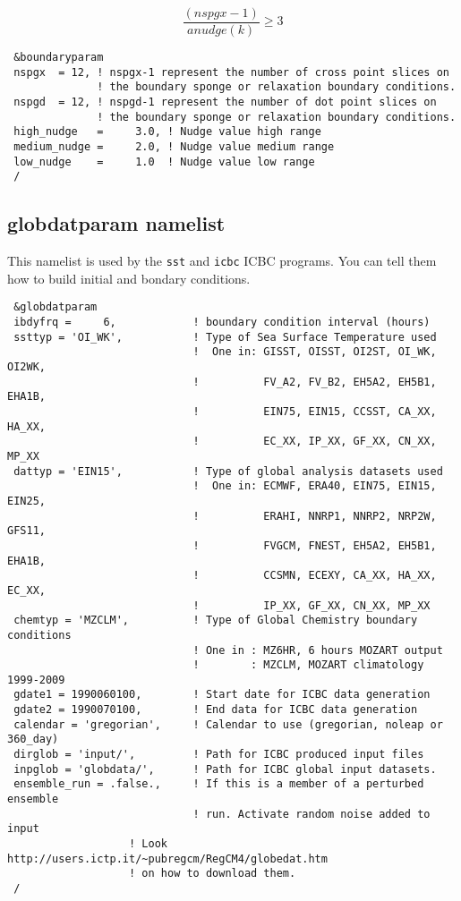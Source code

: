 \begin{equation}
\frac{(nspgx-1)}{anudge(k)} \ge 3
\end{equation}

{\footnotesize
\begin{Verbatim}
 &boundaryparam
 nspgx  = 12, ! nspgx-1 represent the number of cross point slices on
              ! the boundary sponge or relaxation boundary conditions.
 nspgd  = 12, ! nspgd-1 represent the number of dot point slices on
              ! the boundary sponge or relaxation boundary conditions.
 high_nudge   =     3.0, ! Nudge value high range
 medium_nudge =     2.0, ! Nudge value medium range
 low_nudge    =     1.0  ! Nudge value low range
 /
\end{Verbatim}
}

\subsection{globdatparam namelist}
\label{globparam}

This namelist is used by the \verb=sst= and \verb=icbc= ICBC programs. You can
tell them how to build initial and bondary conditions.

{\footnotesize
\begin{Verbatim}
 &globdatparam
 ibdyfrq =     6,            ! boundary condition interval (hours)
 ssttyp = 'OI_WK',           ! Type of Sea Surface Temperature used
                             !  One in: GISST, OISST, OI2ST, OI_WK, OI2WK,
                             !          FV_A2, FV_B2, EH5A2, EH5B1, EHA1B,
                             !          EIN75, EIN15, CCSST, CA_XX, HA_XX,
                             !          EC_XX, IP_XX, GF_XX, CN_XX, MP_XX
 dattyp = 'EIN15',           ! Type of global analysis datasets used
                             !  One in: ECMWF, ERA40, EIN75, EIN15, EIN25,
                             !          ERAHI, NNRP1, NNRP2, NRP2W, GFS11,
                             !          FVGCM, FNEST, EH5A2, EH5B1, EHA1B,
                             !          CCSMN, ECEXY, CA_XX, HA_XX, EC_XX,
                             !          IP_XX, GF_XX, CN_XX, MP_XX
 chemtyp = 'MZCLM',          ! Type of Global Chemistry boundary conditions
                             ! One in : MZ6HR, 6 hours MOZART output
                             !        : MZCLM, MOZART climatology 1999-2009
 gdate1 = 1990060100,        ! Start date for ICBC data generation
 gdate2 = 1990070100,        ! End data for ICBC data generation
 calendar = 'gregorian',     ! Calendar to use (gregorian, noleap or 360_day)
 dirglob = 'input/',         ! Path for ICBC produced input files
 inpglob = 'globdata/',      ! Path for ICBC global input datasets.
 ensemble_run = .false.,     ! If this is a member of a perturbed ensemble
                             ! run. Activate random noise added to input
                   ! Look http://users.ictp.it/~pubregcm/RegCM4/globedat.htm
                   ! on how to download them.
 /
\end{Verbatim}
}

